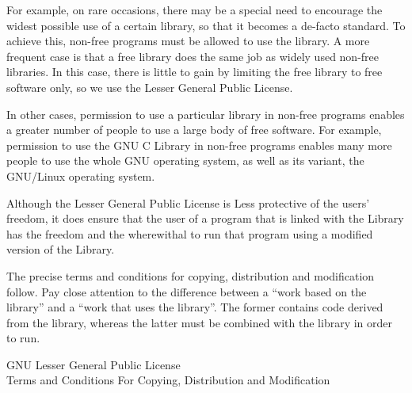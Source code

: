 \documentclass[12pt]{report}
\begin{document}
For example, on rare occasions, there may be a special need to encourage
the widest possible use of a certain library, so that it becomes a
de-facto standard.  To achieve this, non-free programs must be allowed to
use the library.  A more frequent case is that a free library does the
same job as widely used non-free libraries.  In this case, there is little
to gain by limiting the free library to free software only, so we use the
Lesser General Public License.

In other cases, permission to use a particular library in non-free
programs enables a greater number of people to use a large body of free
software.  For example, permission to use the GNU C Library in non-free
programs enables many more people to use the whole GNU operating system,
as well as its variant, the GNU/Linux operating system.

Although the Lesser General Public License is Less protective of the
users' freedom, it does ensure that the user of a program that is linked
with the Library has the freedom and the wherewithal to run that program
using a modified version of the Library.

The precise terms and conditions for copying, distribution and
modification follow.  Pay close attention to the difference between a
``work based on the library'' and a ``work that uses the library''.  The
former contains code derived from the library, whereas the latter must be
combined with the library in order to run.

\begin{center}
{\Large \sc GNU Lesser General Public License} \\
{\Large \sc Terms and Conditions For Copying, Distribution and
  Modification}
\end{center}
\end{document}
